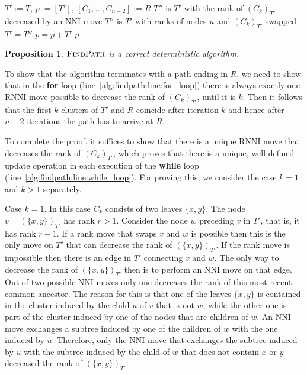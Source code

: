 \documentclass[11pt]{amsart}
\newtheorem{proposition}{Proposition}
\newcommand{\rnni}{\mathrm{RNNI}}
\newcommand{\findpath}{\textsc{FindPath}}
\newcommand{\rank}{\mathrm{rank}}
\newcommand{\nni}{\mathrm{NNI}}
\begin{document}
\begin{algorithm}[H]
\caption{$\findpath$($T,R$)}
\begin{algorithmic}[1]
\STATE $T' := T$, $p := [T']$, $[C_1, \ldots, C_{n-2}] := R$
\label{alg:findpath:line:for_loop}
	\WHILE {$\rank((C_k)_{T'})>k$}
	\label{alg:findpath:line:while_loop}
			\STATE $T''$ is $T'$ with the rank of $(C_k)_{T'}$ decreased by an $\nni$ move
		\ELSE
			\STATE $T''$ is $T'$ with ranks of nodes $u$ and $(C_k)_{T'}$ swapped
		\ENDIF
		\STATE $T' = T''$
		\STATE $p = p+T'$
	\ENDWHILE
\ENDFOR
\RETURN $p$
\end{algorithmic}
\end{algorithm}

\begin{proposition}
$\findpath$ is a correct deterministic algorithm.
\end{proposition}

\proof
To show that the algorithm terminates with a path ending in $R$, we need to show that in the \textbf{for} loop (line~\ref{alg:findpath:line:for_loop}) there is always exactly one $\rnni$ move possible to decrease the rank of $(C_k)_{T'}$, until it is $k$.
Then it follows that the first $k$ clusters of $T'$ and $R$ coincide after iteration $k$ and hence after $n-2$ iterations the path has to arrive at $R$.

To complete the proof, it suffices to show that there is a unique $\rnni$ move that decreases the rank of $(C_k)_{T'}$, which proves that there is a unique, well-defined update operation in each execution of the \textbf{while} loop (line~\ref{alg:findpath:line:while_loop}).
For proving this, we consider the case $k = 1$ and $k>1$ separately.

Case $k = 1$.
In this case $C_k$ consists of two leaves $\{x, y\}$.
The node $v = (\{x, y\})_{T'}$ has rank $r > 1$.
Consider the node $w$ preceding $v$ in $T'$, that is, it has rank $r - 1$.
If a rank move that swaps $v$ and $w$ is possible then this is the only move on $T'$ that can decrease the rank of $(\{x, y\})_{T'}$.
If the rank move is impossible then there is an edge in $T'$ connecting $v$ and $w$.
The only way to decrease the rank of $(\{x, y\})_{T'}$ then is to perform an $\nni$ move on that edge.
Out of two possible $\nni$ moves only one decreases the rank of this most recent common ancestor.
The reason for this is that one of the leaves $\{x,y\}$ is contained in the cluster induced by the child $u$ of $v$ that is not $w$, while the other one is part of the cluster induced by one of the nodes that are children of $w$.
An $\nni$ move exchanges a subtree induced by one of the children of $w$ with the one induced by $u$.
Therefore, only the $\nni$ move that exchanges the subtree induced by $u$ with the subtree induced by the child of $w$ that does not contain $x$ or $y$ decreased the rank of $(\{x, y\})_{T'}$.
\end{document}
